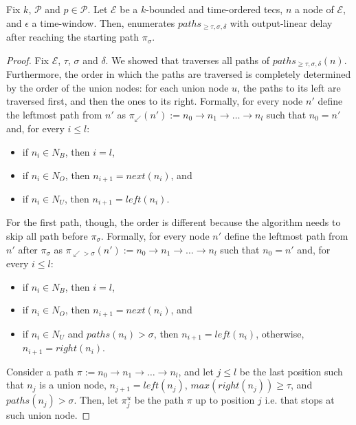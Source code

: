 \begin{lemma}\label{lemma:enumeration:process}
  Fix $k$, $\mathcal{P}$ and $p \in \mathcal{P}$. Let $\mathcal{E}$ be a $k$-bounded and time-ordered \acrshort{tecs}, $n$ a node of $\mathcal{E}$, and $\epsilon$ a time-window. Then,  enumerates $paths_{\ge \tau, \sigma, \delta}$ with output-linear delay after reaching the starting path $\pi_{\sigma}$.
\end{lemma}

\begin{proof}
  Fix $\mathcal{E}$, $\tau$, $\sigma$ and $\delta$. We showed that  traverses all paths of $paths_{\ge \tau, \sigma, \delta}(n)$. Furthermore, the order in which the paths are traversed is completely determined by the order of the union nodes: for each union node $u$, the paths to its left are traversed first, and then the ones to its right. Formally, for every node $n'$ define the leftmost path from $n'$ as ${\pi_{\swarrow}(n') := n_{0} \rightarrow n_{1} \rightarrow \ldots \rightarrow n_{l}}$ such that $n_{0} = n'$ and, for every $i \le l$:

  \begin{itemize}
      \item if $n_{i} \in N_{B}$, then $i = l$,
      \item if $n_{i} \in N_{O}$, then $n_{i+1} = next(n_{i})$, and
      \item if $n_{i} \in N_{U}$, then $n_{i+1} = left(n_{i})$.
  \end{itemize}

  For the first path, though, the order is different because the algorithm needs to skip all path before $\pi_{\sigma}$. Formally, for every node $n'$ define the leftmost path from $n'$ after $\pi_{\sigma}$ as ${\pi_{\swarrow > \sigma}(n') := n_{0} \rightarrow n_{1} \rightarrow \ldots \rightarrow n_{l}}$ such that $n_{0} = n'$ and, for every $i \le l$:
  \begin{itemize}
      \item if $n_{i} \in N_{B}$, then $i = l$,
      \item if $n_{i} \in N_{O}$, then $n_{i+1} = next(n_{i})$, and
      \item if $n_{i} \in N_{U}$ and $paths(n_{i}) > \sigma$, then ${n_{i+1} = left(n_{i})}$, otherwise, ${n_{i+1} = right(n_{i})}$.
  \end{itemize}

  Consider a path $\pi := n_{0} \rightarrow n_{1} \rightarrow \ldots \rightarrow n_{l}$, and let $j \leq l$ be the last position such that $n_{j}$ is a union node, $n_{j+1} = left(n_{j})$, $max(right(n_{j})) \ge \tau$, and $paths(n_{j}) > \sigma$. Then, let $\pi^{u}_{j}$ be the path $\pi$ up to position $j$ i.e. that stops at such union node.


\end{proof}
